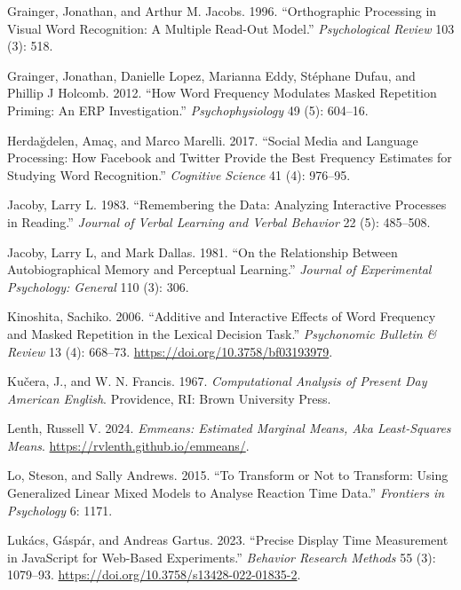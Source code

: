 \documentclass[
]{interact}
\newlength{\cslhangindent}
\newenvironment{CSLReferences}[2] %
 {\begin{list}{}{%
  \setlength{\itemindent}{0pt}
  \setlength{\leftmargin}{0pt}
  \setlength{\parsep}{0pt}
  \ifodd #1
   \setlength{\leftmargin}{\cslhangindent}
   \setlength{\itemindent}{-1\cslhangindent}
  \fi
  \setlength{\itemsep}{#2\baselineskip}}}
 {\end{list}}
\begin{document}
\begin{CSLReferences}{1}{0}
Grainger, Jonathan, and Arthur M. Jacobs. 1996. {``Orthographic
Processing in Visual Word Recognition: A Multiple Read-Out Model.''}
\emph{Psychological Review} 103 (3): 518.

Grainger, Jonathan, Danielle Lopez, Marianna Eddy, Stéphane Dufau, and
Phillip J Holcomb. 2012. {``How Word Frequency Modulates Masked
Repetition Priming: An ERP Investigation.''} \emph{Psychophysiology} 49
(5): 604--16.

Herdağdelen, Amaç, and Marco Marelli. 2017. {``Social Media and Language
Processing: How Facebook and Twitter Provide the Best Frequency
Estimates for Studying Word Recognition.''} \emph{Cognitive Science} 41
(4): 976--95.

Jacoby, Larry L. 1983. {``Remembering the Data: Analyzing Interactive
Processes in Reading.''} \emph{Journal of Verbal Learning and Verbal
Behavior} 22 (5): 485--508.

Jacoby, Larry L, and Mark Dallas. 1981. {``On the Relationship Between
Autobiographical Memory and Perceptual Learning.''} \emph{Journal of
Experimental Psychology: General} 110 (3): 306.

Kinoshita, Sachiko. 2006. {``Additive and Interactive Effects of Word
Frequency and Masked Repetition in the Lexical Decision Task.''}
\emph{Psychonomic Bulletin \& Review} 13 (4): 668--73.
\url{https://doi.org/10.3758/bf03193979}.

Kučera, J., and W. N. Francis. 1967. \emph{Computational Analysis of
Present Day American English}. Providence, RI: Brown University Press.

Lenth, Russell V. 2024. \emph{Emmeans: Estimated Marginal Means, Aka
Least-Squares Means}. \url{https://rvlenth.github.io/emmeans/}.

Lo, Steson, and Sally Andrews. 2015. {``To Transform or Not to
Transform: Using Generalized Linear Mixed Models to Analyse Reaction
Time Data.''} \emph{Frontiers in Psychology} 6: 1171.

Lukács, Gáspár, and Andreas Gartus. 2023. {``Precise Display Time
Measurement in JavaScript for Web-Based Experiments.''} \emph{Behavior
Research Methods} 55 (3): 1079--93.
\url{https://doi.org/10.3758/s13428-022-01835-2}.


\end{CSLReferences}
\end{document}
